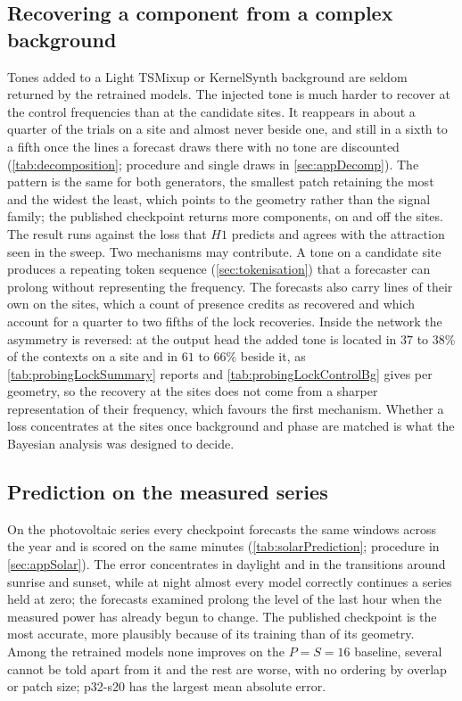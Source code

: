 \subsection{Recovering a component from a complex background}

Tones added to a Light TSMixup or KernelSynth background are seldom returned by the retrained models. The injected tone is much harder to recover at the control frequencies than at the candidate sites. It reappears in about a quarter of the trials on a site and almost never beside one, and still in a sixth to a fifth once the lines a forecast draws there with no tone are discounted (\autoref{tab:decomposition}; procedure and single draws in \autoref{sec:appDecomp}). The pattern is the same for both generators, the smallest patch retaining the most and the widest the least, which points to the geometry rather than the signal family; the published checkpoint returns more components, on and off the sites. The result runs against the loss that $H1$ predicts and agrees with the attraction seen in the sweep. Two mechanisms may contribute. A tone on a candidate site produces a repeating token sequence (\autoref{sec:tokenisation}) that a forecaster can prolong without representing the frequency. The forecasts also carry lines of their own on the sites, which a count of presence credits as recovered and which account for a quarter to two fifths of the lock recoveries. 
{\color{red}Inside the network the asymmetry is reversed: at the output head the added tone is located in $37$ to $38\%$ of the contexts on a site and in $61$ to $66\%$ beside it, as \autoref{tab:probingLockSummary} reports and \autoref{tab:probingLockControlBg} gives per geometry, so the recovery at the sites does not come from a sharper representation of their frequency, which favours the first mechanism.} %
Whether a loss concentrates at the sites once background and phase are matched is what the Bayesian analysis was designed to decide.

\subsection{Prediction on the measured series}

On the photovoltaic series every checkpoint forecasts the same windows across the year and is scored on the same minutes (\autoref{tab:solarPrediction}; procedure in \autoref{sec:appSolar}). The error concentrates in daylight and in the transitions around sunrise and sunset, while at night almost every model correctly continues a series held at zero; the forecasts examined prolong the level of the last hour when the measured power has already begun to change. The published checkpoint is the most accurate, more plausibly because of its training than of its geometry. Among the retrained models none improves on the $P=S=16$ baseline, several cannot be told apart from it and the rest are worse, with no ordering by overlap or patch size; p32-s20 has the largest mean absolute error.

